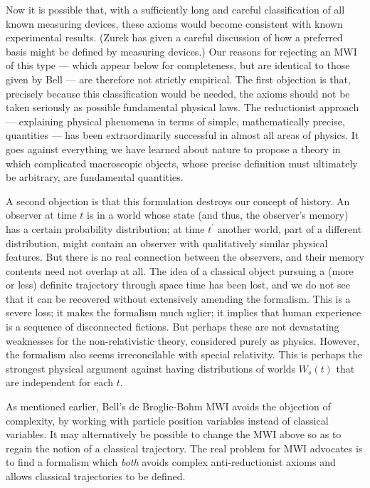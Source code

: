 \documentclass[aps,pra,12pt]{revtex4}
\begin{document}
Now it is possible that, with a sufficiently long and careful classification
of all known measuring devices, these axioms would become consistent
with known experimental results. 
(Zurek\cite{zurek} has given a careful discussion of how a preferred basis
might be defined by measuring devices.)
Our reasons for rejecting an MWI of this type --- which appear below for
completeness, but are identical to those
given by Bell\cite{bell1,bell2} --- are therefore not strictly
empirical.   
The first objection is that, 
precisely because this classification would be needed, the axioms 
should not be taken seriously as possible fundamental physical laws. 
The reductionist approach --- explaining physical phenomena in terms of 
simple, mathematically precise, quantities --- has been extraordinarily
successful in almost all areas of physics.  
It goes against everything we have learned about nature to propose a theory
in which complicated macroscopic objects, whose precise definition must 
ultimately be arbitrary, are fundamental quantities. 

A second objection is that this formulation
destroys our concept of history.  
An observer at time $t$ is in a world whose state (and thus, the observer's
memory) has a certain probability distribution; at time $t^{\prime}$ 
another world, part of a different distribution, might contain an observer with
qualitatively similar physical features.  
But there is no real connection between the observers, and their memory 
contents
need not overlap at all. 
The idea of a classical object pursuing a (more or less) definite trajectory
through space time has been lost, and we do not see that it can be recovered
without extensively amending the formalism. 
This is a severe loss; it makes the formalism much uglier; it implies
that human experience is a sequence of disconnected fictions.
But perhaps these are not devastating weaknesses for the non-relativistic 
theory, considered purely as physics. 
However, the formalism also seems irreconcilable with special relativity.
This is perhaps the strongest physical argument against having
distributions of worlds $W_s (t)$ that are independent for each $t$. 

As mentioned earlier, Bell's de Broglie-Bohm MWI avoids the objection
of complexity, by working with particle position variables instead
of classical variables. It may alternatively be possible to change the
MWI above so as to regain the notion of a classical trajectory.
The real problem for MWI advocates is to find a formalism which {\em both} 
avoids complex anti-reductionist axioms and allows classical trajectories
to be defined. 
\end{document}
